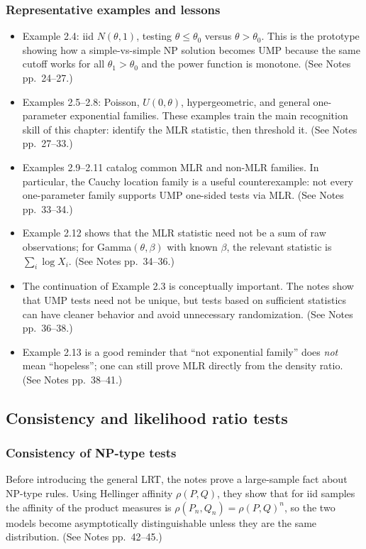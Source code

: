 \subsubsection{Representative examples and lessons}
\begin{itemize}
    \item Example 2.4: iid $N(\theta,1)$, testing $\theta \le \theta_0$ versus $\theta > \theta_0$. This is the prototype showing how a simple-vs-simple NP solution becomes UMP because the same cutoff works for all $\theta_1 > \theta_0$ and the power function is monotone. (See Notes pp.~24--27.)
    \item Examples 2.5--2.8: Poisson, $U(0,\theta)$, hypergeometric, and general one-parameter exponential families. These examples train the main recognition skill of this chapter: identify the MLR statistic, then threshold it. (See Notes pp.~27--33.)
    \item Examples 2.9--2.11 catalog common MLR and non-MLR families. In particular, the Cauchy location family is a useful counterexample: not every one-parameter family supports UMP one-sided tests via MLR. (See Notes pp.~33--34.)
    \item Example 2.12 shows that the MLR statistic need not be a sum of raw observations; for Gamma$(\theta,\beta)$ with known $\beta$, the relevant statistic is $\sum_i \log X_i$. (See Notes pp.~34--36.)
    \item The continuation of Example 2.3 is conceptually important. The notes show that UMP tests need not be unique, but tests based on sufficient statistics can have cleaner behavior and avoid unnecessary randomization. (See Notes pp.~36--38.)
    \item Example 2.13 is a good reminder that ``not exponential family'' does \emph{not} mean ``hopeless''; one can still prove MLR directly from the density ratio. (See Notes pp.~38--41.)
\end{itemize}

\subsection{Consistency and likelihood ratio tests}
\subsubsection{Consistency of NP-type tests}
Before introducing the general LRT, the notes prove a large-sample fact about NP-type rules. Using Hellinger affinity $\rho(P,Q)$, they show that for iid samples the affinity of the product measures is $\rho(P_n,Q_n)=\rho(P,Q)^n$, so the two models become asymptotically distinguishable unless they are the same distribution. (See Notes pp.~42--45.)

